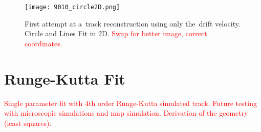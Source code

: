 		\begin{figure}
			\centering
			\texttt{[image: 9010\_circle2D.png]}
			\caption{First attempt at a~track reconstruction using only the~drift velocity. Circle and Lines Fit in 2D. \textcolor{red}{Swap for better image, correct coordinates.}}
			\label{fig:9010circle2D}
		\end{figure}
	
	\section{Runge-Kutta Fit}
		\textcolor{red}{Single parameter fit with 4th order Runge-Kutta simulated track. Future testing with microscopic simulations and map simulation. Derivation of the geometry (least squares).}